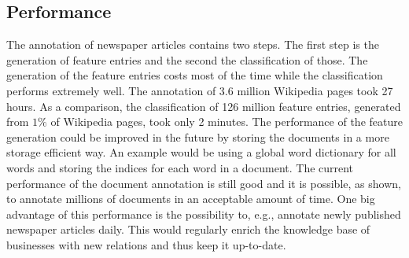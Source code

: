 \subsection*{Performance}
The annotation of newspaper articles contains two steps. The first step is the generation of feature entries and the second the classification of those. The generation of the feature entries costs most of the time while the classification performs extremely well. The annotation of 3.6 million Wikipedia pages took 27 hours. As a comparison, the classification of 126 million feature entries, generated from $1\%$ of Wikipedia pages, took only 2 minutes. The performance of the feature generation could be improved in the future by storing the documents in a more storage efficient way. An example would be using a global word dictionary for all words and storing the indices for each word in a document. The current performance of the document annotation is still good and it is possible, as shown, to annotate millions of documents in an acceptable amount of time. One big advantage of this performance is the possibility to, e.g., annotate newly published newspaper articles daily. This would regularly enrich the knowledge base of businesses with new relations and thus keep it up-to-date.\par

